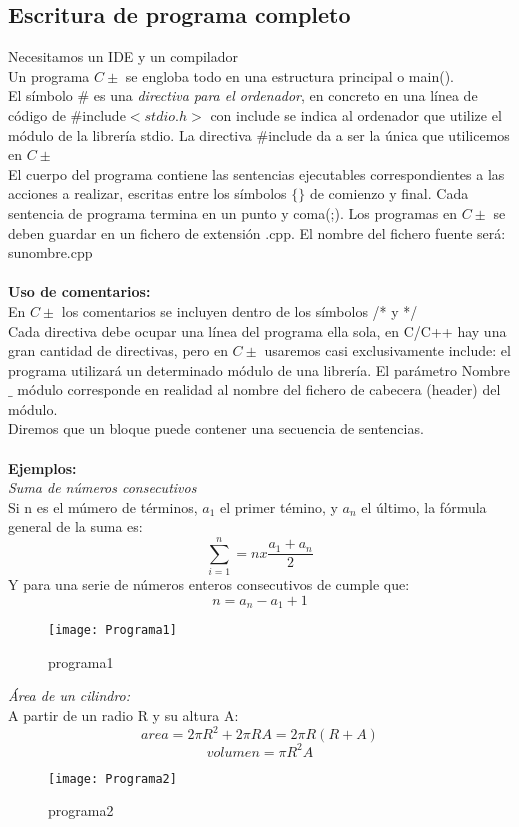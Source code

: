 \documentclass[11pt,a4paper]{article}
\begin{document}
\subsection{Escritura de programa completo}
Necesitamos un IDE y un compilador\\
Un programa $C\pm$ se engloba todo en una estructura principal o main().\\
El símbolo $\#$ es una \textit{directiva para el ordenador}, en concreto en una línea de código de $\#$include$<stdio.h>$ con include se indica al ordenador que utilize el módulo de la librería stdio.
La directiva $\#$include da a ser la única que utilicemos en $C\pm$\\
El cuerpo del programa contiene las sentencias ejecutables correspondientes a las acciones a realizar, escritas entre los símbolos $\{\}$ de comienzo y final. Cada sentencia de programa termina en un punto y coma(;). Los programas en $C\pm$ se deben guardar en un fichero de extensión .cpp. El nombre del fichero fuente será: sunombre.cpp
\\
\\
\textbf{Uso de comentarios:}\\
En $C\pm$ los comentarios se incluyen dentro de los símbolos /* y */\\
Cada directiva debe ocupar una línea del programa ella sola, en C/C++ hay una gran cantidad de directivas, pero en $C\pm$ usaremos casi exclusivamente include: el programa utilizará un determinado módulo de una librería. El parámetro Nombre$\_$ módulo 
corresponde en realidad al nombre del fichero de cabecera (header) del módulo.\\
Diremos que un bloque puede contener una 
secuencia de sentencias.\\
\\
\textbf{Ejemplos:}\\
\textit{Suma de números consecutivos}\\
Si n es el múmero de términos, $a_{1}$ el primer témino, y $a_{n}$ el último, la fórmula general de la suma es: $$\sum_{i=1}^{n} = nx\frac{a_{1} + a_{n}}{2}$$
Y para una serie de números enteros consecutivos de cumple que: $$n = a_{n}-a_{1}+1$$
\begin{figure}[htb]
	\centering
	\texttt{[image: Programa1]}
	\caption{programa1}
	\label{fig:prog1}
\end{figure}

\textit{Área de un cilindro:}\\
A partir de un radio R y su altura A: 
$$area = 2\pi R^2 + 2\pi RA = 2\pi R(R+A) $$
$$volumen = \pi R^2A$$
\begin{figure}[htb]
	\centering
	\texttt{[image: Programa2]}
	\caption{programa2}
	\label{fig:prog2}
\end{figure}
\end{document}
